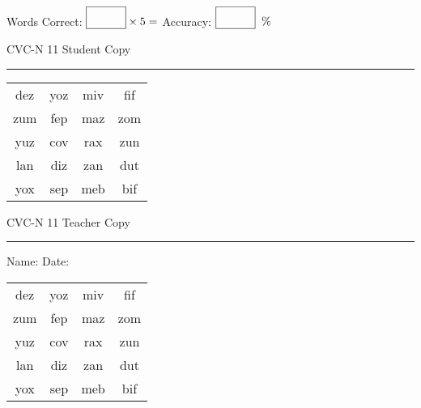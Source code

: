 \documentclass{memoir}
\begin{document}
\small

Words Correct: $\fbox{\phantom{\huge 100}} \times 5 = $ Accuracy: $\fbox{\phantom{\huge 100}}\;\; \%$ 

\vfill

\newpage


\footnotesize \noindent
CVC-N 11 \hfill Student Copy
\smallskip
\hrule

\Large

\setlength{\tabcolsep}{14pt}
\def\arraystretch{2}

{\selectfont


\begin{vplace}[0.5]
\begin{center}
\begin{tabular}{cccc}
dez & yoz & miv & fif \\
zum & fep & maz & zom \\
yuz & cov & rax & zun \\
lan & diz & zan & dut \\
yox & sep & meb & bif \\
\end{tabular}
\end{center}
\end{vplace}

}

\newpage

\footnotesize \noindent
CVC-N 11 \hfill Teacher Copy
\smallskip
\hrule

\small

\vfill

\noindent
Name: \underline{\hspace{1.75in}} \hfill Date: \underline{\hspace{1in}}

\Large

{\selectfont


\begin{vplace}[0.5]
\begin{center}
\begin{tabular}{cccc}
dez & yoz & miv & fif \\
zum & fep & maz & zom \\
yuz & cov & rax & zun \\
lan & diz & zan & dut \\
yox & sep & meb & bif \\
\end{tabular}
\end{center}
\end{vplace}



}
\end{document}
